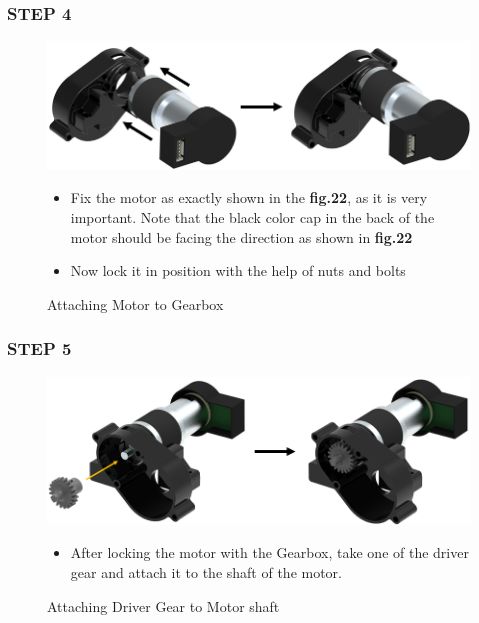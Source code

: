 \documentclass[12pt,a4paper,oneside]{book}
\begin{document}
			\subsubsection*{STEP 4}
				\begin{figure}[H]
					\begin{center}
						\includegraphics[scale=0.65]{ATTACHING MOTOR TO GEARBOX}
						\caption{Attaching Motor to Gearbox}
					\end{center}
					\begin{itemize}
						\item Fix the motor as exactly shown in the \textbf{fig.22}, as it is very important. Note that the black color cap in the back of the motor should be facing the direction as shown in \textbf{fig.22}
						\item Now lock it in position with the help of nuts and bolts 
					\end{itemize}
				\end{figure}

			\subsubsection*{STEP 5}
				\begin{figure}[H]
					\begin{center}
						\includegraphics[scale=0.65]{ATTACHING DRIVER GEAR TO MOTOR}
						\caption{Attaching Driver Gear to Motor shaft}
					\end{center}
					\begin{itemize}
						\item After locking the motor with the Gearbox, take one of the driver gear and attach it to the shaft of the motor.
					\end{itemize}
				\end{figure}
				
\end{document}
